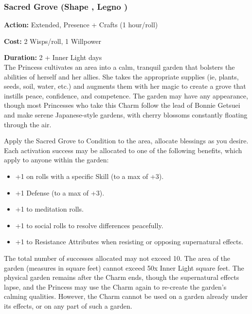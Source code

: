 \subsubsection*{Sacred Grove (Shape \textbullet\textbullet\textbullet\textbullet, Legno  \textbullet\textbullet\textbullet)}

\noindent \textbf{Action:} Extended, Presence + Crafts (1 hour/roll)

\noindent \textbf{Cost:} 2 Wisps/roll, 1 Willpower

\noindent \textbf{Duration:} 2 + Inner Light days \\

\noindent The Princess cultivates an area into a calm, tranquil garden that bolsters the abilities of herself and her allies. She takes the appropriate supplies (ie, plants, seeds, soil, water, etc.) and augments them with her magic to create a grove that instills peace, confidence, and competence. The garden may have any appearance, though most Princesses who take this Charm follow the lead of Bonnie Getsuei and make serene Japanese-style gardens, with cherry blossoms constantly floating through the air. 

Apply the Sacred Grove to Condition to the area, allocate blessings as you desire. Each activation success may be allocated to one of the following benefits, which apply to anyone within the garden:

  \begin{itemize} \item  +1 on rolls with a specific Skill (to a max of +3).
  \item  +1 Defense (to a max of +3).
  \item  +1 to meditation rolls.
  \item  +1 to social rolls to resolve differences peacefully.
  \item  +1 to Resistance Attributes when resisting or opposing supernatural effects. \end{itemize}

The total number of successes allocated may not exceed 10. The area of the garden (measures in square feet) cannot exceed 50x Inner Light square feet. The physical garden remains after the Charm ends, though the supernatural effects lapse, and the Princess may use the Charm again to re-create the garden's calming qualities. However, the Charm cannot be used on a garden already under its effects, or on any part of such a garden.

